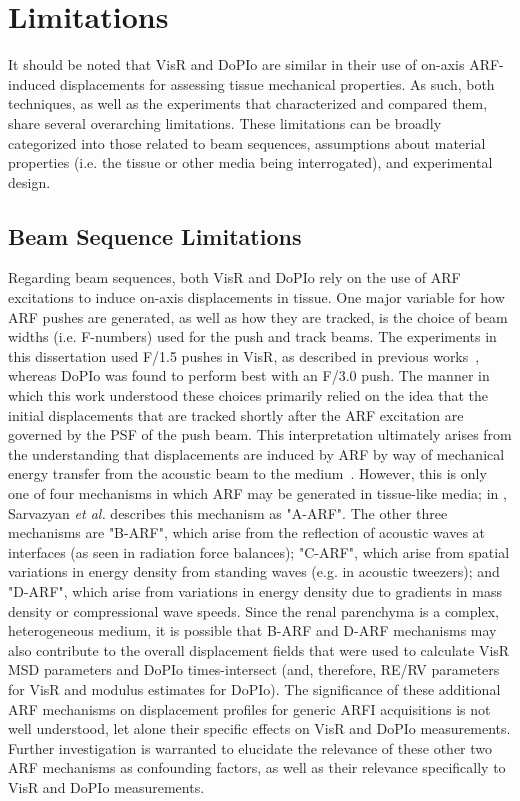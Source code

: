 
\section{Limitations}
\label{sec:limitations}

It should be noted that VisR and DoPIo are similar in their use of on-axis ARF-induced displacements for assessing tissue mechanical properties. As such, both techniques, as well as the experiments that characterized and compared them, share several overarching limitations. These limitations can be broadly categorized into those related to beam sequences, assumptions about material properties (i.e. the tissue or other media being interrogated), and experimental design.

\subsection{Beam Sequence Limitations}

Regarding beam sequences, both VisR and DoPIo rely on the use of ARF excitations to induce on-axis displacements in tissue. One major variable for how ARF pushes are generated, as well as how they are tracked, is the choice of beam widths (i.e. F-numbers) used for the push and track beams. The experiments in this dissertation used F/1.5 pushes in VisR, as described in previous works~\cite{hossain_Evaluating_2018,hossain_Viscoelastic_2020}, whereas DoPIo was found to perform best with an F/3.0 push. The manner in which this work understood these choices primarily relied on the idea that the initial displacements that are tracked shortly after the ARF excitation are governed by the PSF of the push beam. This interpretation ultimately arises from the understanding that displacements are induced by ARF by way of mechanical energy transfer from the acoustic beam to the medium~\cite{sarvazyan_Shear_1998,sarvazyan_Acoustic_2021}. However, this is only one of four mechanisms in which ARF may be generated in tissue-like media; in \cite{sarvazyan_Acoustic_2021}, Sarvazyan \emph{et al.} describes this mechanism as "A-ARF". The other three mechanisms are "B-ARF", which arise from the reflection of acoustic waves at interfaces (as seen in radiation force balances); "C-ARF", which arise from spatial variations in energy density from standing waves (e.g. in acoustic tweezers); and "D-ARF", which arise from variations in energy density due to gradients in mass density or compressional wave speeds. Since the renal parenchyma is a complex, heterogeneous medium, it is possible that B-ARF and D-ARF mechanisms may also contribute to the overall displacement fields that were used to calculate VisR MSD parameters and DoPIo times-intersect (and, therefore, RE/RV parameters for VisR and modulus estimates for DoPIo). The significance of these additional ARF mechanisms on displacement profiles for generic ARFI acquisitions is not well understood, let alone their specific effects on VisR and DoPIo measurements. Further investigation is warranted to elucidate the relevance of these other two ARF mechanisms as confounding factors, as well as their relevance specifically to VisR and DoPIo measurements.

